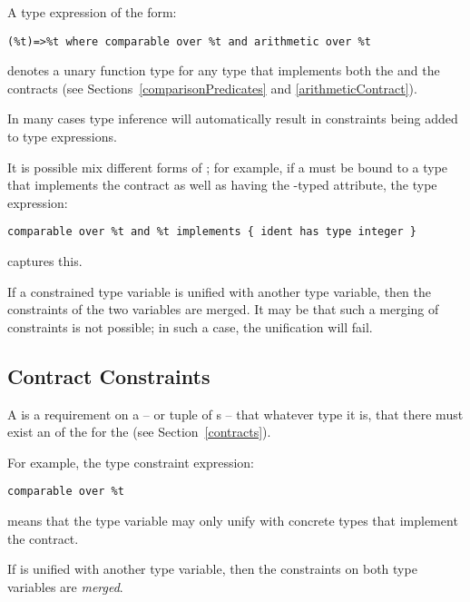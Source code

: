 A type expression of the form:
\begin{lstlisting}
(%t)=>%t where comparable over %t and arithmetic over %t
\end{lstlisting}
denotes a unary function type for any type that implements both the  and the  contracts (see Sections~\vref{comparisonPredicates} and \vref{arithmeticContract}).

\begin{aside}
In many cases type inference will automatically result in constraints being added to type expressions. 
\end{aside}

It is possible mix different forms of ; for example, if a  must be bound to a type that implements the  contract as well as having the -typed  attribute, the type expression:
\begin{lstlisting}
comparable over %t and %t implements { ident has type integer }
\end{lstlisting}
captures this.

\begin{aside}
If a constrained type variable is unified with another type variable, then the constraints of the two variables are merged. It may be that such a merging of constraints is not possible; in such a case, the unification will fail.
\end{aside}

\subsection{Contract Constraints}
\label{contractContraint}
A  is a requirement on a  -- or tuple of s -- that whatever type it is, that there must exist an  of the  for the  (see Section~\vref{contracts}).

For example, the type constraint expression:
\begin{lstlisting}
comparable over %t
\end{lstlisting}
means that the type variable  may only unify with concrete types that implement the  contract.
\begin{aside}
If  is unified with another type variable, then the constraints on both type variables are \emph{merged}.
\end{aside}


